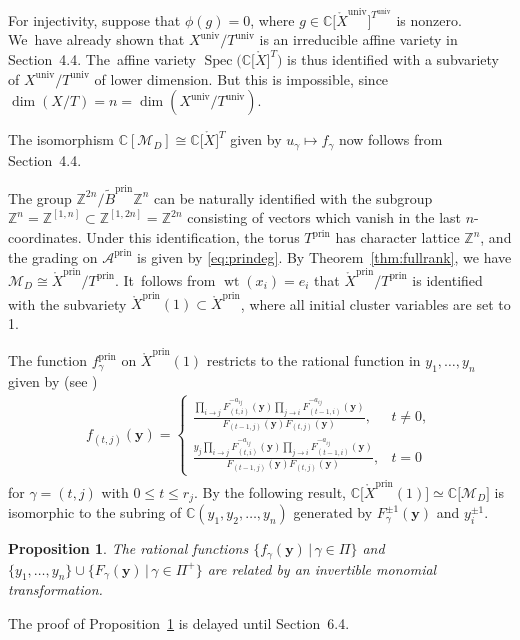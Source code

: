 \documentclass[pdftex]{sigma}%
\def\C{{\mathbb C}}
\def\Z{{\mathbb Z}}
\def\A{{\mathcal{A}}}
\def\Xo{{\mathring{X}}}
\def\Spec{\operatorname{Spec}}
\def\prin{{\operatorname{prin}}}
\def\univ{{\operatorname{univ}}}
\def\tB{{\tilde B}}
\def\wt{\operatorname{wt}}
\def\M{{\mathcal{M}}}
\def\tB{{\tilde B}}
\def\y{{\mathbf y}}
\numberwithin{equation}{section}
\newtheorem{Proposition}[Theorem]{Proposition}
\begin{document}
For injectivity, suppose that $\phi(g) = 0$, where $g \in \C\big[\Xo^\univ\big]^{T^\univ}$ is nonzero. We~have already shown that $X^\univ/T^\univ$ is an irreducible affine variety in Section~4.4. The~affine variety $\Spec\big(\C\big[\Xo\big]^T\big)$ is thus identified with a subvariety of $X^\univ/T^\univ$ of lower dimension. But this is impossible, since $\dim(X/T) =n = \dim(X^\univ/T^\univ)$.

The isomorphism $\C[\M_D] \cong \C\big[\Xo\big]^T$ given by $u_\gamma \mapsto f_\gamma$ now follows from Section~4.4.

\bigskip{}
The group $\Z^{2n}/\tB^\prin \Z^n$ can be naturally identified with the subgroup $\Z^n = \Z^{[1,n]} \subset \Z^{[1,2n]}=\Z^{2n}$ consisting of vectors which vanish in the last $n$-coordinates. Under this identification, the torus $T^\prin$ has character lattice $\Z^n$, and the grading on $\A^\prin$ is given by \eqref{eq:prindeg}. By Theorem~\ref{thm:fullrank}, we have $\M_D \cong \Xo^\prin/T^\prin$. It~follows from $\wt(x_i) = e_i$ that $\Xo^\prin/T^\prin$ is identified with the subvariety $\Xo^\prin(1) \subset \Xo^\prin$, where all initial cluster variables are set to 1.

The function $f^\prin_\gamma$ on $\Xo^\prin(1)$ restricts to the rational function in $y_1,\dots,y_n$ given by (see \cite[Theorem~1.5]{YZ})
\begin{gather} \label{eq:fy}
f_{(t,j)}(\y) = \begin{cases}
\frac{\prod_{i \to j} F_{(t,i)}^{-a_{ij}}(\y) \prod_{j \to i} F_{(t-1,i)}^{-a_{ij}}(\y)}{F_{(t-1,j)}(\y) F_{(t,j)}(\y) }, &t \neq 0,
\\[1.5ex]
 \frac{y_j \prod_{i \to j} F_{(t,i)}^{-a_{ij}}(\y) \prod_{j \to i} F_{(t-1,i)}^{-a_{ij}}(\y)}{F_{(t-1,j)}(\y) F_{(t,j)}(\y) }, &t = 0
 \end{cases}
\end{gather}
for $\gamma = (t,j)$ with $0 \leq t \leq r_j$.
By the following result, $\C\big[\Xo^\prin(1)] \simeq \C[\M_D\big]$ is isomorphic to the subring of $\C(y_1,y_2,\dots,y_n)$ generated by $F_\gamma^{\pm 1}(\y)$ and $y_i^{\pm 1}$.

\begin{Proposition}\label{prop:hinvert}
The rational functions $\{f_\gamma(\y) \,|\, \gamma \in \Pi\}$ and $\{y_1,\dots,y_n\} \cup \{ F_\gamma(\y) \,|\, \gamma \in \Pi^+\}$ are related by an invertible monomial transformation.
\end{Proposition}
The proof of Proposition~\ref{prop:hinvert} is delayed until Section~6.4.
\end{document}
